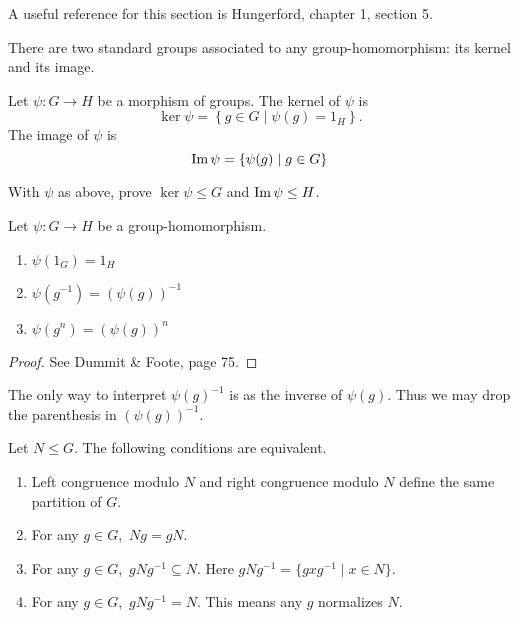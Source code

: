 \documentclass[11pt,a4paper]{article}
\begin{document}
A useful reference for this section is Hungerford, chapter 1, section 5.

There are two standard groups associated to any group-homomorphism: its kernel and its image.
\begin{defi}
    Let  \(\psi \colon G\to H\) be a morphism of groups.
    The kernel of \(\psi\) is 
    \[\ker \psi =\left\{ g\in G \mid \psi(g) = 1_H \right\}.\]
    The image of \(\psi\) is 
    \[\operatorname{Im}\psi = \left\{ \psi(g) \mid g\in G \right\}\]
\end{defi}

\begin{eje}[Classwork]
    With \(\psi\) as above, prove \(\ker\psi \leq G\) and \(\operatorname{Im} \psi \leq H \).
\end{eje}

\begin{prop}
    Let \(\psi\colon G\to H\) be a group-homomorphism.
    \begin{enumerate}[label=(\roman*)]
        \item \(\psi(1_G) = 1_H\)
        \item \(\psi(g^{-1}) = (\psi(g))^{-1}\)
        \item \(\psi(g^n) = (\psi(g))^n\)
    \end{enumerate}
\end{prop}

\begin{proof}
    See Dummit \& Foote, page 75.
\end{proof}

The only way to interpret \(\psi(g)^{-1}\) is as the inverse of \(\psi(g)\).
Thus we may drop the parenthesis in \((\psi(g))^{-1}\).


\begin{teo}\label{equivalent.conditions.normality}
Let \(N\leq G\).
The following conditions are equivalent.
\begin{enumerate}[label=(\roman*)]
\item Left congruence modulo \(N\) and right congruence modulo \(N\) define the same partition of \(G\).
\item For any \(g\in G\),\, \(Ng = gN\).
\item For any \(g\in G\),\, \(gNg^{-1}\subseteq N\). Here \(gNg^{-1} =\{  gxg^{-1} \mid x\in N\}\).
\item For any \(g\in G\),\, \(gNg^{-1} = N\). This means any \(g\) normalizes \(N\).
\end{enumerate}
\end{teo}
\end{document}
